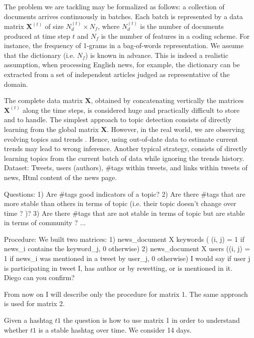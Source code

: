 \iffalse
The problem we are tackling may be formalized as follows: a collection of documents arrives continuously in batches. Each batch is represented by a data matrix $\mathbf{X}^{(t)}$ of size $N_d^{(t)} \times N_f$, where $N_d^{(t)}$ is the number of documents produced at time step $t$ and $N_f$ is the number of features in a coding scheme. For instance, the frequency of 1-grams in a bag-of-words representation. We assume that the dictionary (i.e. $N_f$) is known in advance.  This is indeed a realistic assumption, when processing English news, for example, the dictionary can be extracted from a set of independent articles judged as representative of the domain.

The complete data matrix $\mathbf{X}$, obtained by concatenating vertically the matrices $\mathbf{X}^{(t)}$ along the time steps, is considered huge and practically difficult to store and to handle. The simplest approach to topic detection consists of directly learning from the global matrix  $\mathbf{X}$.  
However, in the real world, we are observing evolving topics and trends \cite{mathioudakis2010twittermonitor}.  Hence, using out-of-date data to estimate current trends may lead to wrong inference.  Another typical strategy, consists of directly learning topics from the current batch of data while ignoring the trends history.\\

Dataset: 
Tweets, users (authors), #tags within tweets, and links within tweets of news, Html content of the news page.


Questions:
1) Are #tags good indicators of a topic? 
2) Are there #tags that are more stable than others in terms of topic (i.e. their topic doesn't change over time ? )?
3) Are there #tags that are not stable in terms of topic but are stable in terms of community ?
...


Procedure:
We built two matrices: 
	1) news_document X keywords ( (i, j) = 1 if news_i contains the keyword_j, 0 otherwise)
	2) news_document X users ((i, j) = 1 if news_i was mentioned in a tweet by user_j, 0 otherwise)
I would say if user j is participating in tweet I, has author or by rewetting, or is mentioned in it. Diego can you confirm?	
	
From now on I will describe only the procedure for matrix 1. The same approach is used for matrix 2.

Given a hashtag $t1$ the question is how to use matrix 1 in order to understand whether $t1$ is a stable hashtag over time. We consider 14 days. 

